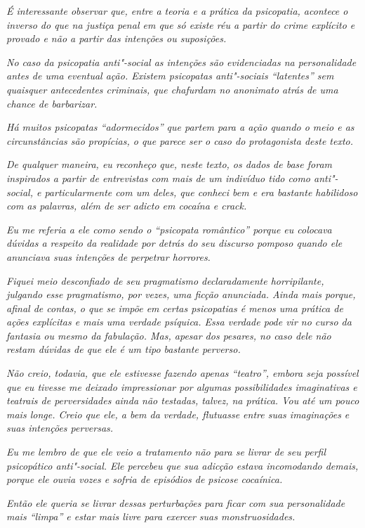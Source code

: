 \emph{É interessante observar que, entre a teoria e a prática da
psicopatia, acontece o inverso do que na justiça penal em que só existe
réu a partir do crime explícito e provado e não a partir das intenções
ou suposições.}~

\emph{No caso da psicopatia anti"-social as intenções são evidenciadas na
personalidade antes de uma eventual ação. Existem psicopatas
anti"-sociais ``latentes'' sem quaisquer antecedentes criminais, que
chafurdam no anonimato atrás de uma chance de barbarizar.}~

\emph{Há muitos psicopatas ``adormecidos'' que partem para a ação quando
o meio e as circunstâncias são propícias, o que parece ser o caso do
protagonista deste texto.}~

\emph{De qualquer maneira, eu reconheço que, neste texto, os dados de
base foram inspirados a partir de entrevistas com mais de um indivíduo
tido como anti"-social, e particularmente com um deles, que conheci bem e
era bastante habilidoso com as palavras, além de ser adicto em cocaína e
crack.}~

\emph{Eu me referia a ele como sendo o ``psicopata romântico'' porque eu
colocava dúvidas a respeito da realidade por detrás do seu discurso
pomposo quando ele anunciava suas intenções de perpetrar horrores.}~

\emph{Fiquei meio desconfiado de seu pragmatismo declaradamente
horripilante, julgando esse pragmatismo, por vezes, uma ficção
anunciada. Ainda mais porque, afinal de contas, o que se impõe em certas
psicopatias é menos uma prática de ações explícitas e mais uma verdade
psíquica. Essa verdade pode vir no curso da fantasia ou mesmo da
fabulação. Mas, apesar dos pesares, no caso dele não restam dúvidas de
que ele é um tipo bastante perverso.}

\emph{Não creio, todavia, que ele estivesse fazendo apenas ``teatro'',
embora seja possível que eu tivesse me deixado impressionar por algumas
possibilidades imaginativas e teatrais de perversidades ainda não
testadas, talvez, na prática. Vou até um pouco mais longe. Creio que
ele, a bem da verdade, flutuasse entre suas imaginações e suas intenções
perversas.}~

\emph{Eu me lembro de que ele veio a tratamento não para se livrar de
seu perfil psicopático anti"-social. Ele percebeu que sua adicção estava
incomodando demais, porque ele ouvia vozes e sofria de episódios de
psicose cocaínica.}~

\emph{Então ele queria se livrar dessas perturbações para ficar com sua
personalidade mais ``limpa'' e estar mais livre para exercer suas
monstruosidades.}~

